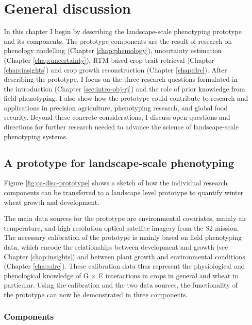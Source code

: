 \chapter{General discussion}
\label{chap:general-discussion}

In this chapter I begin by describing the landscape-scale phenotyping prototype and its components. The prototype components are the result of research on phenology modelling (Chapter \ref{chap:phemology}), uncertainty estimation (Chapter \ref{chap:uncertainty}), \gls{RTM}-based crop trait retrieval (Chapter \ref{chap:insights}) and crop growth reconstruction (Chapter \ref{chap:drc}). After describing the prototype, I focus on the three research questions formulated in the introduction (Chapter \ref{sec:intro-obj-rj}) and the role of prior knowledge from field phenotyping. I also show how the prototype could contribute to research and applications in precision agriculture, phenotyping research, and global food security. Beyond these concrete considerations, I discuss open questions and directions for further research needed to advance the science of landscape-scale phenotyping systems.

\section{A prototype for landscape-scale phenotyping}
Figure \ref{fig:oa-disc-prototype} shows a sketch of how the individual research components can be transferred to a landscape level prototype to quantify winter wheat growth and development.

The main data sources for the prototype are environmental covariates, mainly air temperature, and high resolution optical satellite imagery from the \gls{S2} mission. The necessary calibration of the prototype is mainly based on field phenotyping data, which encode the relationships between development and growth (see Chapter \ref{chap:insights}) and between plant growth and environmental conditions (Chapter \ref{chap:drc}). These calibration data thus represent the physiological and phenological knowledge of G $\times$ E interactions in crops in general and wheat in particular. Using the calibration and the two data sources, the functionality of the prototype can now be demonstrated in three components.

\subsection{Components}


